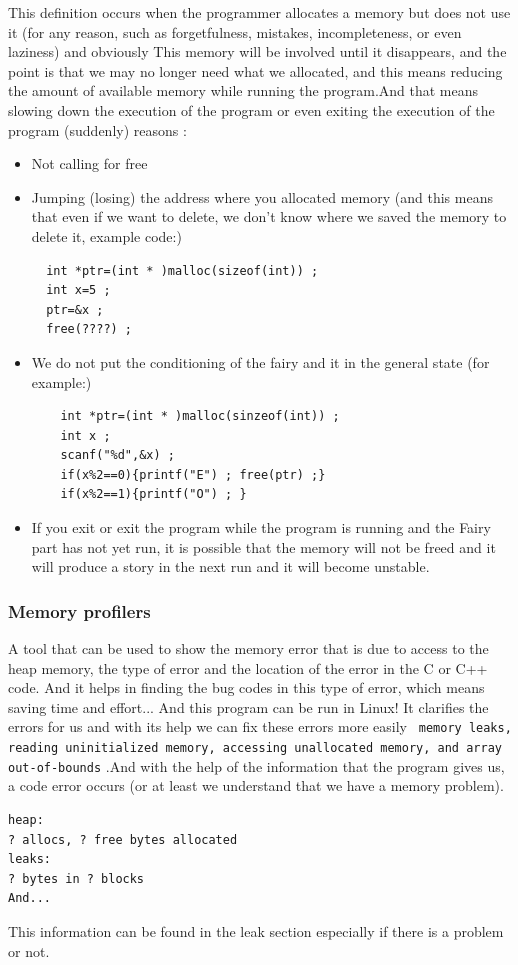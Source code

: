 \documentclass[12pt]{article}
\begin{document}
This definition occurs when the programmer allocates a memory but does not use it (for any reason, such as forgetfulness, mistakes, incompleteness, or even laziness) and obviously This memory will be involved until it disappears, and the point is that we may no longer need what we allocated, and this means reducing the amount of available memory while running the program.And that means slowing down the execution of the program or even exiting the execution of the program (suddenly)
\newpage
 reasons :
\begin{itemize}
  \item Not calling for free
  \item Jumping (losing) the address where you allocated memory (and this means that even if we want to delete, we don't know where we saved the memory to delete it, example code:)\newline
  \begin{lstlisting}
  int *ptr=(int * )malloc(sizeof(int)) ;
  int x=5 ;
  ptr=&x ;
  free(????) ;
  \end{lstlisting}
  \item We do not put the conditioning of the fairy and it in the general state (for example:)\newline
  \begin{lstlisting}
    int *ptr=(int * )malloc(sinzeof(int)) ;
    int x ;
    scanf("%d",&x) ;
    if(x%2==0){printf("E") ; free(ptr) ;}
    if(x%2==1){printf("O") ; }
  \end{lstlisting}
  \item If you exit or exit the program while the program is running and the Fairy part has not yet run, it is possible that the memory will not be freed and it will produce a story in the next run and it will become unstable.


\end{itemize}

\subsubsection{Memory profilers}
A tool that can be used to show the memory error that is due to access to the heap memory, the type of error and the location of the error in the C or C++ code.
And it helps in finding the bug codes in this type of error, which means saving time and effort...\newline
And this program can be run in Linux!\newline
It clarifies the errors for us and with its help we can fix these errors more easily
\texttt{ memory leaks, reading uninitialized memory, accessing unallocated memory, and array out-of-bounds}
.And with the help of the information that the program gives us, a code error occurs (or at least we understand that we have a memory problem).
\begin{lstlisting}
heap:
? allocs, ? free bytes allocated
leaks:
? bytes in ? blocks
And...
\end{lstlisting}
This information can be found in the leak section especially if there is a problem or not.
\end{document}
